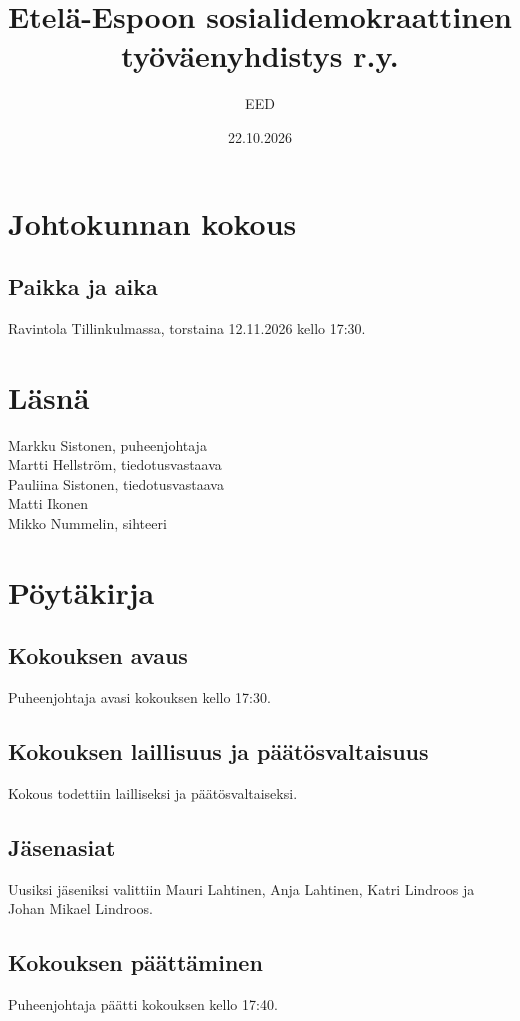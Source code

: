 \documentclass[a4paper,12pt]{article}
\title{Etelä-Espoon sosialidemokraattinen työväenyhdistys r.y.}
\author{EED}
\date{22.10.2026}
\begin{document}
\maketitle
\tableofcontents
\section*{Johtokunnan kokous}
\subsection*{Paikka ja aika}
Ravintola Tillinkulmassa, torstaina 12.11.2026 kello 17:30.
\section*{Läsnä}
Markku Sistonen, puheenjohtaja \\
Martti Hellström, tiedotusvastaava \\
Pauliina Sistonen, tiedotusvastaava \\
Matti Ikonen \\
Mikko Nummelin, sihteeri
\section*{Pöytäkirja}
\subsection{Kokouksen avaus}
Puheenjohtaja avasi kokouksen kello 17:30.
\subsection{Kokouksen laillisuus ja päätösvaltaisuus}
Kokous todettiin lailliseksi ja päätösvaltaiseksi.
\subsection{Jäsenasiat}
Uusiksi jäseniksi valittiin Mauri Lahtinen, Anja Lahtinen, Katri Lindroos ja Johan Mikael Lindroos.
\subsection{Kokouksen päättäminen}
Puheenjohtaja päätti kokouksen kello 17:40.
\end{document}
